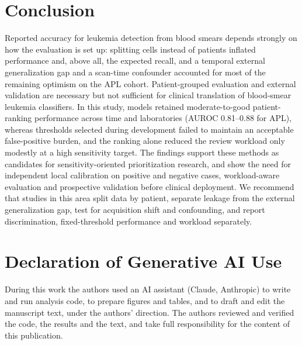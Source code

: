 \documentclass[journal]{IEEEtran}
\begin{document}
\section{Conclusion}
Reported accuracy for leukemia detection from blood smears depends strongly on how the evaluation is set up: splitting cells instead of patients inflated performance and, above all, the expected recall, and a temporal external generalization gap and a scan-time confounder accounted for most of the remaining optimism on the APL cohort. Patient-grouped evaluation and external validation are necessary but not sufficient for clinical translation of blood-smear leukemia classifiers. In this study, models retained moderate-to-good patient-ranking performance across time and laboratories (AUROC 0.81--0.88 for APL), whereas thresholds selected during development failed to maintain an acceptable false-positive burden, and the ranking alone reduced the review workload only modestly at a high sensitivity target. The findings support these methods as candidates for sensitivity-oriented prioritization research, and show the need for independent local calibration on positive and negative cases, workload-aware evaluation and prospective validation before clinical deployment. We recommend that studies in this area split data by patient, separate leakage from the external generalization gap, test for acquisition shift and confounding, and report discrimination, fixed-threshold performance and workload separately.

\section*{Declaration of Generative AI Use}
During this work the authors used an AI assistant (Claude, Anthropic) to write and run analysis code, to prepare figures and tables, and to draft and edit the manuscript text, under the authors' direction. The authors reviewed and verified the code, the results and the text, and take full responsibility for the content of this publication.
\end{document}
